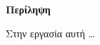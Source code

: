 \thispagestyle{empty}


\begin{titlepage}
\begin{center}

{\bf\Large{Περίληψη}}\\

\end{center}

\indent Στην εργασία αυτή \ldots

\vfill

\end{titlepage}


